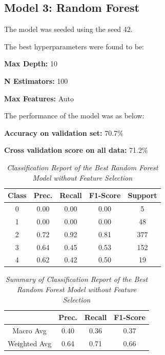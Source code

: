 \subsection{Model 3: Random Forest}
The model was seeded using the seed 42.

The best hyperparameters were found to be:

\textbf{Max Depth: } 10

\textbf{N Estimators: } 100

\textbf{Max Features: } Auto


\noindent
The performance of the model was as below:

\noindent
\textbf{Accuracy on validation set:} 70.7\%

\noindent
\textbf{Cross validation score on all data:} 71.2\%  

\begin{table}[!ht]
    \begin{center}
        \begin{tabular}{c|c|c|c|c}			
            \hline
            Class & Prec. & Recall & F1-Score & Support \\
            \hline\hline
            0 & 0.00 & 0.00 & 0.00 & 5 \\
            1 & 0.00 & 0.00 & 0.00 & 48 \\
            2 & 0.72 & 0.92 & 0.81 & 377 \\
            3 & 0.64 & 0.45 & 0.53 & 152 \\
            4 & 0.62 & 0.42 & 0.50 & 19\\
            \hline
        \end{tabular}

        \caption{\textit{Classification Report of the Best Random Forest Model without Feature Selection}}
        \label{rf-report}

    \end{center}
\end{table}
\begin{table}[!ht]
    \begin{center}
        \begin{tabular}{c||c|c|c}			
            \hline
             & Prec. & Recall & F1-Score \\
             \hline\hline
            Macro Avg & 0.40 & 0.36 & 0.37 \\
            Weighted Avg & 0.64 & 0.71 & 0.66 \\
            \hline
        \end{tabular}

        \caption{\textit{Summary of Classification Report of the Best Random Forest Model without Feature Selection}}
        \label{rf-report-sum}

    \end{center}
\end{table}
